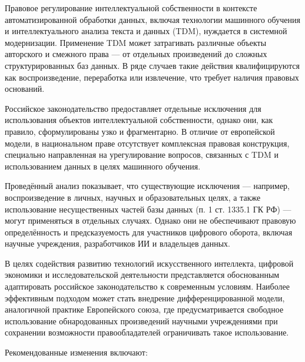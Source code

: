 \conclusion

Правовое регулирование интеллектуальной собственности в контексте
автоматизированной обработки данных, включая технологии машинного обучения и
интеллектуального анализа текста и данных (TDM), нуждается в системной
модернизации. Применение TDM может затрагивать различные объекты авторского и
смежного права — от отдельных произведений до сложных структурированных баз
данных. В ряде случаев такие действия квалифицируются как воспроизведение,
переработка или извлечение, что требует наличия правовых оснований.

Российское законодательство предоставляет отдельные исключения для
использования объектов интеллектуальной собственности, однако они, как правило,
сформулированы узко и фрагментарно. В отличие от европейской модели, в
национальном праве отсутствует комплексная правовая конструкция, специально
направленная на урегулирование вопросов, связанных с TDM и использованием
данных в целях машинного обучения.

Проведённый анализ показывает, что существующие исключения — например,
воспроизведение в личных, научных и образовательных целях, а также
использование несущественных частей базы данных (п. 1 ст. 1335.1 ГК РФ) — могут
применяться в отдельных случаях. Однако они не обеспечивают правовую
определённость и предсказуемость для участников цифрового оборота, включая
научные учреждения, разработчиков ИИ и владельцев данных.

В целях содействия развитию технологий искусственного интеллекта, цифровой
экономики и исследовательской деятельности представляется обоснованным
адаптировать российское законодательство к современным условиям. Наиболее
эффективным подходом может стать внедрение дифференцированной модели,
аналогичной практике Европейского союза, где предусматривается свободное
использование обнародованных произведений научными учреждениями при сохранении
возможности правообладателей ограничивать такое использование.

Рекомендованные изменения включают:

